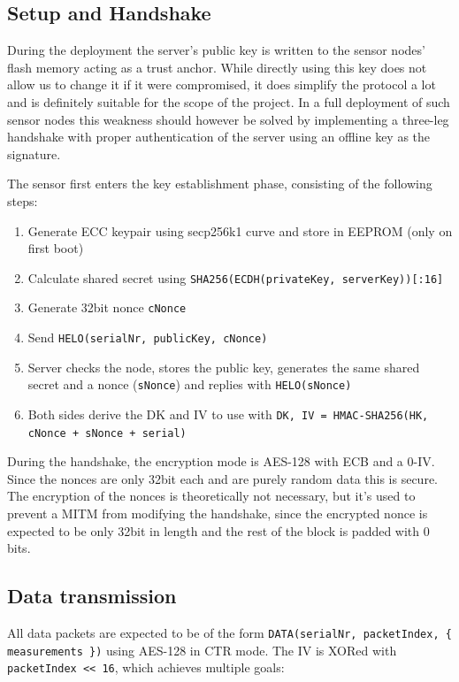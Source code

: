 \documentclass[a4paper,11pt]{scrartcl}
\begin{document}
\subsection{Setup and Handshake}
During the deployment the server's public key is written to the sensor nodes' flash memory acting as a trust anchor. While directly using this key does not allow us to change it if it were compromised, it does simplify the protocol a lot and is definitely suitable for the scope of the project. In a full deployment of such sensor nodes this weakness should however be solved by implementing a three-leg handshake with proper authentication of the server using an offline key as the signature.

The sensor first enters the key establishment phase, consisting of the following steps:
\begin{enumerate}
\item Generate ECC keypair using secp256k1 curve and store in EEPROM (only on first boot)
\item Calculate shared secret using \texttt{SHA256(ECDH(privateKey, serverKey))[:16]}
\item Generate 32bit nonce \texttt{cNonce}
\item Send \texttt{HELO(serialNr, publicKey, {cNonce})}
\item Server checks the node, stores the public key, generates the same shared secret and a nonce (\texttt{sNonce}) and replies with \texttt{HELO({sNonce})}
\item Both sides derive the DK and IV to use with \texttt{DK, IV = HMAC-SHA256(HK,
cNonce + sNonce + serial)}
\end{enumerate}

During the handshake, the encryption mode is AES-128 with ECB and a 0-IV. Since the nonces are only 32bit each and are purely random data this is secure. The encryption of the nonces is theoretically not necessary, but it's used to prevent a MITM from modifying the handshake, since the encrypted nonce is expected to be only 32bit in length and the rest of the block is padded with 0 bits.

\subsection{Data transmission}
All data packets are expected to be of the form \texttt{DATA(serialNr, packetIndex, \{ measurements \})} using AES-128 in CTR mode. The IV is XORed with \texttt{packetIndex << 16}, which achieves multiple goals:
\end{document}
